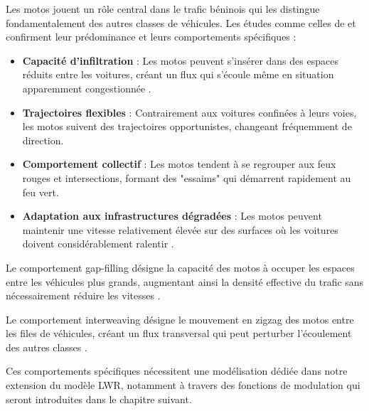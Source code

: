 Les motos jouent un rôle central dans le trafic béninois qui les distingue fondamentalement des autres classes de véhicules. Les études comme celles de \cite{loggoh2019traffic} et \cite{aerc2019taxi} confirment leur prédominance et leurs comportements spécifiques :

\begin{itemize}
\item \textbf{Capacité d'infiltration} : Les motos peuvent s'insérer dans des espaces réduits entre les voitures, créant un flux qui s'écoule même en situation apparemment congestionnée \cite{kumar2018motorcycle}.

\item \textbf{Trajectoires flexibles} : Contrairement aux voitures confinées à leurs voies, les motos suivent des trajectoires opportunistes, changeant fréquemment de direction.

\item \textbf{Comportement collectif} : Les motos tendent à se regrouper aux feux rouges et intersections, formant des "essaims" qui démarrent rapidement au feu vert.

\item \textbf{Adaptation aux infrastructures dégradées} : Les motos peuvent maintenir une vitesse relativement élevée sur des surfaces où les voitures doivent considérablement ralentir \cite{karthik2019estimation}.
\end{itemize}

\begin{definition}
Le comportement gap-filling désigne la capacité des motos à occuper les espaces entre les véhicules plus grands, augmentant ainsi la densité effective du trafic sans nécessairement réduire les vitesses \cite{fan2013heterogeneous}.
\end{definition}

\begin{definition}[Interweaving]
Le comportement interweaving désigne le mouvement en zigzag des motos entre les files de véhicules, créant un flux transversal qui peut perturber l'écoulement des autres classes \cite{kumar2018motorcycle}.
\end{definition}

Ces comportements spécifiques nécessitent une modélisation dédiée dans notre extension du modèle LWR, notamment à travers des fonctions de modulation qui seront introduites dans le chapitre suivant.

